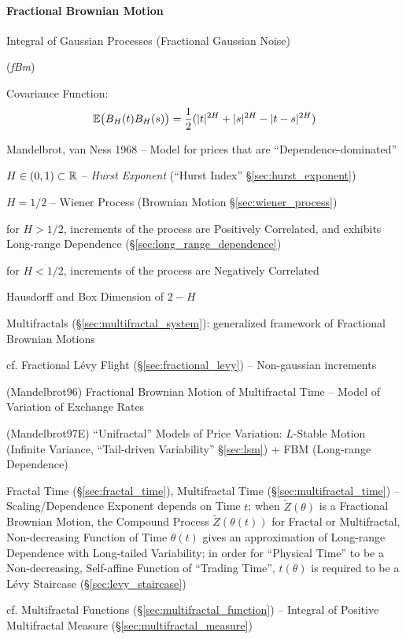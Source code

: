 \paragraph{Fractional Brownian Motion}\label{sec:fractional_brownian}\hfill

Integral of Gaussian Processes (Fractional Gaussian Noise)

(\emph{fBm})

Covariance Function:
\[
  \mathbb{E}\big(B_H(t) B_H(s)\big) =
    \frac{1}{2} (|t|^{2H} + |s|^{2H} - |t - s|^{2H})
\]

Mandelbrot, van Ness 1968 -- Model for prices that are ``Dependence-dominated''

$H \in (0,1) \subset \mathbb{R}$ -- \emph{Hurst Exponent} (``Hurst Index''
\S\ref{sec:hurst_exponent})

$H = 1/2$ -- Wiener Process (Brownian Motion \S\ref{sec:wiener_process})

for $H > 1/2$, increments of the process are Positively Correlated, and exhibits
Long-range Dependence (\S\ref{sec:long_range_dependence})

for $H < 1/2$, increments of the process are Negatively Correlated

Hausdorff and Box Dimension of $2 - H$

\fist Multifractals (\S\ref{sec:multifractal_system}): generalized framework of
Fractional Brownian Motions

cf. Fractional L\'evy Flight (\S\ref{sec:fractional_levy}) -- Non-gaussian
increments

(Mandelbrot96) Fractional Brownian Motion of Multifractal Time -- Model of
Variation of Exchange Rates

(Mandelbrot97E) ``Unifractal'' Models of Price Variation: $L$-Stable Motion
(Infinite Variance, ``Tail-driven Variability'' \S\ref{sec:lsm}) + FBM
(Long-range Dependence)

\fist Fractal Time (\S\ref{sec:fractal_time}), Multifractal Time
(\S\ref{sec:multifractal_time}) -- Scaling/Dependence Exponent depends on Time
$t$; when $\tilde{Z}(\theta)$ is a Fractional Brownian Motion, the Compound
Process $\tilde{Z}(\theta(t))$ for Fractal or Multifractal, Non-decreasing
Function of Time $\theta(t)$ gives an approximation of Long-range Dependence
with Long-tailed Variability; in order for ``Physical Time'' to be a
Non-decreasing, Self-affine Function of ``Trading Time'', $t(\theta)$ is
required to be a L\'evy Staircase (\S\ref{sec:levy_staircase})

cf. Multifractal Functions (\S\ref{sec:multifractal_function}) -- Integral of
Positive Multifractal Measure (\S\ref{sec:multifractal_measure})

